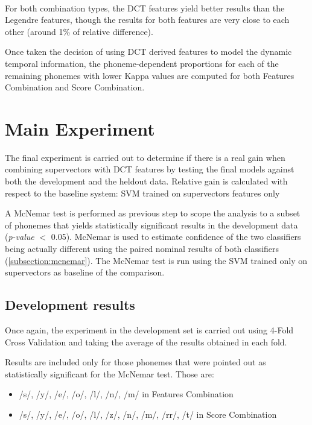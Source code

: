 ~

For both combination types, the DCT features yield better results than the Legendre features,
though the results for both features are very close to each other (around 1\% of relative
difference).

Once taken the decision of using DCT derived features to model the dynamic temporal
information, the phoneme-dependent proportions for each of the remaining phonemes with
lower Kappa values are computed for both Features Combination and Score
Combination.

\section{Main Experiment}

The final experiment is carried out to determine if there is a real gain when combining
supervectors with DCT features by testing the final models against
both the development and the heldout data.
Relative gain is calculated with respect to the baseline system: SVM trained on supervectors
features only

A McNemar test is performed as previous step to scope the analysis
to a subset of phonemes that yields statistically significant results in the development
data (\textit{p-value} $<$ 0.05).
McNemar is used to estimate confidence of the two classifiers being actually different
using the paired nominal results of both classifiers (\ref{subsection:mcnemar}).
The McNemar test is run using the SVM
trained only on supervectors as baseline of the comparison.

\subsection{Development results}

Once again, the experiment in the development set is carried out using 4-Fold Cross Validation
and taking the average of the results obtained in each fold.

Results are included only for those phonemes that were pointed out as statistically
significant for the McNemar test. Those are:

\begin{itemize}
	\item /s/, /y/, /e/, /o/, /l/, /n/, /m/ in Features Combination
	\item /s/, /y/, /e/, /o/, /l/, /z/, /n/, /m/, /rr/, /t/ in Score Combination
\end{itemize}

